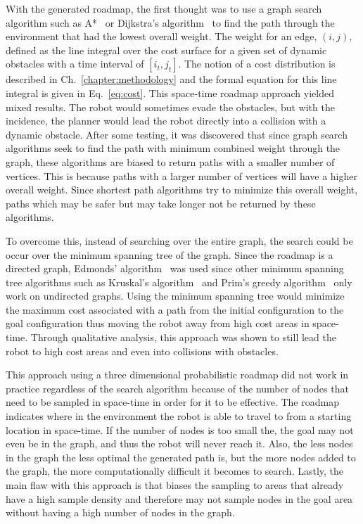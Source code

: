 With the generated roadmap, the first thought was to use a graph search
algorithm such as A*~\cite{astar} or Dijkstra's algorithm~\cite{dijkstra} to
find the path through the environment that had the lowest overall weight.  The
weight for an edge, $(i, j)$, defined as the line integral over the cost
surface for a given set of dynamic obstacles with a time interval of $[i_t,
j_t]$.  The notion of a cost distribution is described in
Ch.~\ref{chapter:methodology} and the formal equation for this line integral is
given in Eq.~\ref{eq:cost}.  This space-time roadmap approach yielded mixed
results.  The robot would sometimes evade the obstacles, but with the
incidence, the planner would lead the robot directly into a collision with a
dynamic obstacle. After some testing, it was discovered that since graph search
algorithms seek to find the path with minimum combined weight through the
graph, these algorithms are biased to return paths with a smaller number of
vertices.  This is because paths with a larger number of vertices will have a
higher overall weight. Since shortest path algorithms try to minimize this
overall weight, paths which may be safer but may take longer not be returned by
these algorithms.

To overcome this, instead of searching over the entire graph, the search could
be occur over the minimum spanning tree of the graph.  Since the roadmap is a
directed graph, Edmonds' algorithm~\cite{edmonds} was used since other minimum
spanning tree algorithms such as Kruskal's algorithm~\cite{kruskal} and Prim's
greedy algorithm~\cite{prim} only work on undirected graphs. Using the minimum
spanning tree would minimize the maximum cost associated with a path from the
initial configuration to the goal configuration thus moving the robot away from
high cost areas in space-time. Through qualitative analysis, this approach was
shown to still lead the robot to high cost areas and even into collisions with
obstacles.

This approach using a three dimensional probabilistic roadmap did not work in
practice regardless of the search algorithm because of the number of nodes that
need to be sampled in space-time in order for it to be effective.  The roadmap
indicates where in the environment the robot is able to travel to from a
starting location in space-time. If the number of nodes is too small the, the
goal may not even be in the graph, and thus the robot will never reach it.
Also, the less nodes in the graph the less optimal the generated path is, but
the more nodes added to the graph, the more computationally difficult it
becomes to search. Lastly, the main flaw with this approach is that biases the
sampling to areas that already have a high sample density and therefore may not
sample nodes in the goal area without having a high number of nodes in the
graph.

